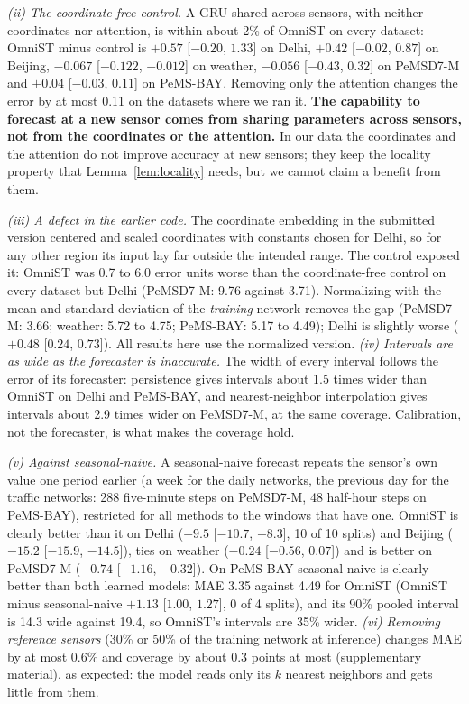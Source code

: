 \documentclass[journal,twoside,web]{ieeecolor}
\begin{document}
\emph{(ii) The coordinate-free control.} A GRU shared across sensors, with neither coordinates nor
attention, is within about 2\% of OmniST on every dataset: OmniST minus control is $+0.57$ [$-0.20$, $1.33$]
on Delhi, $+0.42$ [$-0.02$, $0.87$] on Beijing, $-0.067$ [$-0.122$, $-0.012$] on weather, $-0.056$
[$-0.43$, $0.32$] on PeMSD7-M and $+0.04$ [$-0.03$, $0.11$] on PeMS-BAY. Removing only the attention
changes the error by at most 0.11 on the datasets where we ran it. \textbf{The capability to forecast
at a new sensor comes from sharing parameters across sensors, not from the coordinates or the
attention.} In our data the coordinates and the attention do not improve accuracy at new sensors; they
keep the locality property that Lemma~\ref{lem:locality} needs, but we cannot claim a benefit from them.

\emph{(iii) A defect in the earlier code.} The coordinate embedding in the submitted version centered and scaled
coordinates with constants chosen for Delhi, so for any other region its input lay far outside the intended range.
The control exposed it: OmniST was 0.7 to 6.0 error units worse than the coordinate-free control on every dataset
but Delhi (PeMSD7-M: 9.76 against 3.71). Normalizing with the mean and standard deviation of the \emph{training}
network removes the gap (PeMSD7-M: 3.66; weather: 5.72 to 4.75; PeMS-BAY: 5.17 to 4.49); Delhi is slightly worse
($+0.48$ [$0.24$, $0.73$]). All results here use the normalized version.
\emph{(iv) Intervals are as wide as the forecaster is inaccurate.} The width of every interval follows
the error of its forecaster: persistence gives intervals about 1.5 times wider than OmniST on Delhi
and PeMS-BAY, and nearest-neighbor interpolation gives intervals about 2.9 times wider on PeMSD7-M, at
the same coverage.
Calibration, not the forecaster, is what makes the coverage hold.

\emph{(v) Against seasonal-naive.} A seasonal-naive forecast repeats the sensor's own value one period earlier
(a week for the daily networks, the previous day for the traffic networks: 288 five-minute steps on PeMSD7-M, 48
half-hour steps on PeMS-BAY), restricted for all methods to the windows that have one. OmniST is clearly better than it on
Delhi ($-9.5$ [$-10.7$, $-8.3$], 10 of 10 splits) and Beijing ($-15.2$ [$-15.9$, $-14.5$]), ties on weather
($-0.24$ [$-0.56$, $0.07$]) and is better on PeMSD7-M ($-0.74$ [$-1.16$, $-0.32$]).
On PeMS-BAY seasonal-naive is clearly better than both learned models: MAE 3.35 against 4.49 for OmniST (OmniST
minus seasonal-naive $+1.13$ [$1.00$, $1.27$], 0 of 4 splits), and its 90\% pooled interval is 14.3 wide against
19.4, so OmniST's intervals are 35\% wider.
\emph{(vi) Removing reference sensors} (30\% or 50\% of the training network at inference) changes MAE by at most
0.6\% and coverage by about 0.3 points at most (supplementary material), as expected: the model reads only its $k$
nearest neighbors and gets little from them.
\end{document}
